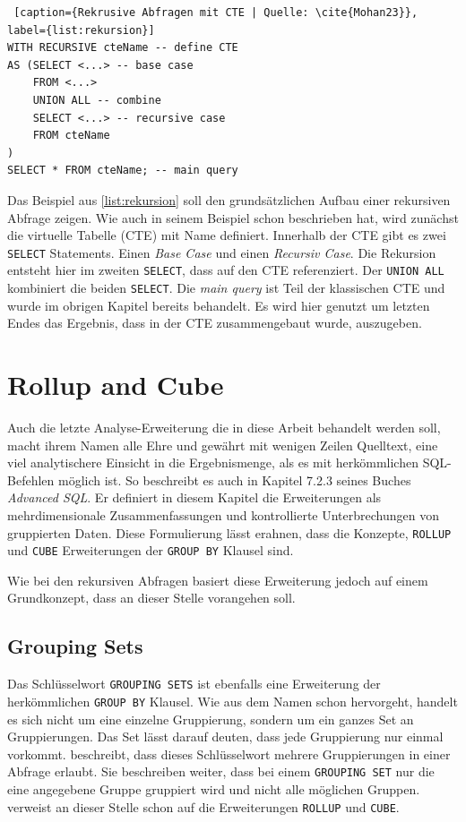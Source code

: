 \begin{lstlisting} [caption={Rekrusive Abfragen mit CTE | Quelle: \cite{Mohan23}}, label={list:rekursion}]
WITH RECURSIVE cteName -- define CTE
AS (SELECT <...> -- base case
	FROM <...>
	UNION ALL -- combine
	SELECT <...> -- recursive case
	FROM cteName
)
SELECT * FROM cteName; -- main query
\end{lstlisting}

Das Beispiel aus \ref{list:rekursion} soll den grundsätzlichen Aufbau einer rekursiven
Abfrage zeigen. Wie auch \cite{Mohan23} in seinem Beispiel schon beschrieben hat,
wird zunächst die virtuelle Tabelle (CTE) mit Name definiert. Innerhalb der CTE
gibt es zwei \texttt{SELECT} Statements. Einen \textit{Base Case} und einen \textit{Recursiv
Case}. Die Rekursion entsteht hier im zweiten \texttt{SELECT}, dass auf den CTE referenziert.
Der \texttt{UNION ALL} kombiniert die beiden \texttt{SELECT}. Die \textit{main
query} ist Teil der klassischen CTE und wurde im obrigen Kapitel bereits
behandelt. Es wird hier genutzt um letzten Endes das Ergebnis, dass in der CTE
zusammengebaut wurde, auszugeben.


\section{Rollup and Cube}
Auch die letzte Analyse-Erweiterung die in diese Arbeit behandelt werden soll, macht
ihrem Namen alle Ehre und gewährt mit wenigen Zeilen Quelltext, eine viel
analytischere Einsicht in die Ergebnismenge, als es mit herkömmlichen SQL-Befehlen
möglich ist. So beschreibt es auch \cite{melton2002advanced} in Kapitel 7.2.3 seines
Buches \textit{Advanced SQL}. Er definiert in diesem Kapitel die Erweiterungen als
mehrdimensionale Zusammenfassungen und kontrollierte Unterbrechungen von gruppierten
Daten. Diese Formulierung lässt erahnen, dass die Konzepte, \texttt{ROLLUP} und \texttt{CUBE}
Erweiterungen der \texttt{GROUP BY} Klausel sind.

Wie bei den rekursiven Abfragen basiert diese Erweiterung jedoch auf einem Grundkonzept,
dass an dieser Stelle vorangehen soll.

\subsection{Grouping Sets}
Das Schlüsselwort \texttt{GROUPING SETS} ist ebenfalls eine Erweiterung der herkömmlichen
\texttt{GROUP BY} Klausel. Wie aus dem Namen schon hervorgeht, handelt es sich
nicht um eine einzelne Gruppierung, sondern um ein ganzes Set an Gruppierungen.
Das Set lässt darauf deuten, dass jede Gruppierung nur einmal vorkommt.
\cite{oracle16} beschreibt, dass dieses Schlüsselwort mehrere Gruppierungen in einer
Abfrage erlaubt. Sie beschreiben weiter, dass bei einem \texttt{GROUPING SET}
nur die eine angegebene Gruppe gruppiert wird und nicht alle möglichen Gruppen. \cite{oracle16}
verweist an dieser Stelle schon auf die Erweiterungen \texttt{ROLLUP} und
\texttt{CUBE}.

